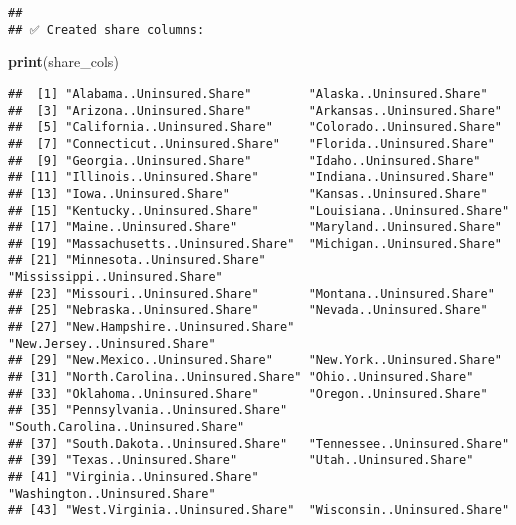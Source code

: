 \documentclass[
]{article}
\newenvironment{Shaded}{\begin{snugshade}}{\end{snugshade}}
\newcommand{\AttributeTok}[1]{\textcolor[rgb]{0.13,0.29,0.53}{#1}}
\newcommand{\CommentTok}[1]{\textcolor[rgb]{0.56,0.35,0.01}{\textit{#1}}}
\newcommand{\ConstantTok}[1]{\textcolor[rgb]{0.56,0.35,0.01}{#1}}
\newcommand{\FunctionTok}[1]{\textcolor[rgb]{0.13,0.29,0.53}{\textbf{#1}}}
\newcommand{\NormalTok}[1]{#1}
\newcommand{\OtherTok}[1]{\textcolor[rgb]{0.56,0.35,0.01}{#1}}
\newcommand{\SpecialCharTok}[1]{\textcolor[rgb]{0.81,0.36,0.00}{\textbf{#1}}}
\newcommand{\StringTok}[1]{\textcolor[rgb]{0.31,0.60,0.02}{#1}}
\begin{document}
\begin{Shaded}
\end{Shaded}

\begin{verbatim}
## 
## ✅ Created share columns:
\end{verbatim}

\begin{Shaded}
\begin{Highlighting}[]
\FunctionTok{print}\NormalTok{(share\_cols)}
\end{Highlighting}
\end{Shaded}

\begin{verbatim}
##  [1] "Alabama..Uninsured.Share"        "Alaska..Uninsured.Share"        
##  [3] "Arizona..Uninsured.Share"        "Arkansas..Uninsured.Share"      
##  [5] "California..Uninsured.Share"     "Colorado..Uninsured.Share"      
##  [7] "Connecticut..Uninsured.Share"    "Florida..Uninsured.Share"       
##  [9] "Georgia..Uninsured.Share"        "Idaho..Uninsured.Share"         
## [11] "Illinois..Uninsured.Share"       "Indiana..Uninsured.Share"       
## [13] "Iowa..Uninsured.Share"           "Kansas..Uninsured.Share"        
## [15] "Kentucky..Uninsured.Share"       "Louisiana..Uninsured.Share"     
## [17] "Maine..Uninsured.Share"          "Maryland..Uninsured.Share"      
## [19] "Massachusetts..Uninsured.Share"  "Michigan..Uninsured.Share"      
## [21] "Minnesota..Uninsured.Share"      "Mississippi..Uninsured.Share"   
## [23] "Missouri..Uninsured.Share"       "Montana..Uninsured.Share"       
## [25] "Nebraska..Uninsured.Share"       "Nevada..Uninsured.Share"        
## [27] "New.Hampshire..Uninsured.Share"  "New.Jersey..Uninsured.Share"    
## [29] "New.Mexico..Uninsured.Share"     "New.York..Uninsured.Share"      
## [31] "North.Carolina..Uninsured.Share" "Ohio..Uninsured.Share"          
## [33] "Oklahoma..Uninsured.Share"       "Oregon..Uninsured.Share"        
## [35] "Pennsylvania..Uninsured.Share"   "South.Carolina..Uninsured.Share"
## [37] "South.Dakota..Uninsured.Share"   "Tennessee..Uninsured.Share"     
## [39] "Texas..Uninsured.Share"          "Utah..Uninsured.Share"          
## [41] "Virginia..Uninsured.Share"       "Washington..Uninsured.Share"    
## [43] "West.Virginia..Uninsured.Share"  "Wisconsin..Uninsured.Share"
\end{verbatim}
\end{document}

